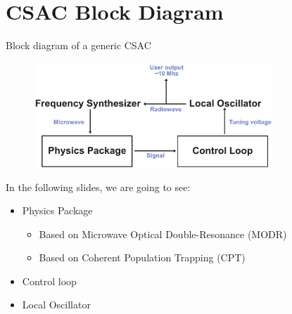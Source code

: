 \section{CSAC Block Diagram}

\begin{frame}{Block diagram of a generic CSAC}

    \begin{figure}
        \centering
        \includegraphics[width=0.8\textwidth]{pdf/logical-diagram.pdf}
    \end{figure}

    In the following slides, we are going to see:

    \begin{itemize}
        \item Physics Package
              \begin{itemize}
                  \item Based on Microwave Optical Double-Resonance (MODR)
                  \item Based on Coherent Population Trapping (CPT)
              \end{itemize}
        \item Control loop
        \item Local Oscillator
    \end{itemize}

\end{frame}